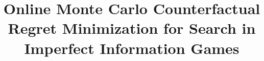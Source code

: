 \documentclass{aamas2015}
\begin{document}

\title{Online Monte Carlo Counterfactual Regret Minimization for Search in Imperfect Information Games}




%
%
%
%

%

\end{document}
